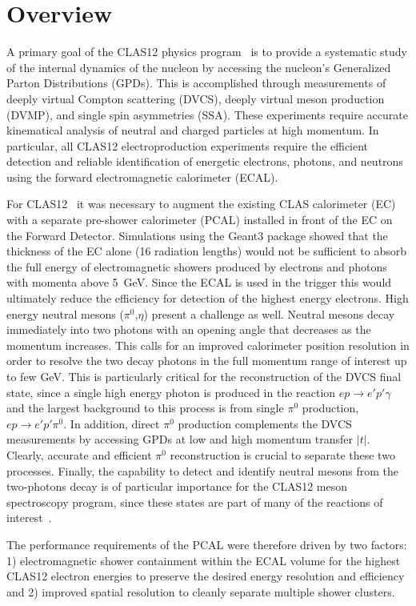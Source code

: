 \section{Overview}

A primary goal of the CLAS12 physics program~\cite{Burkert:2018nvj} is to provide a systematic study of
the internal dynamics of the nucleon by accessing the nucleon's Generalized Parton Distributions (GPDs). This
is accomplished through measurements of deeply virtual Compton scattering (DVCS), deeply virtual meson
production (DVMP), and single spin asymmetries (SSA). These experiments require accurate kinematical
analysis of neutral and charged particles at high momentum. In particular, all CLAS12 electroproduction
experiments require the efficient detection and reliable identification of energetic electrons, photons, and
neutrons using the forward electromagnetic calorimeter (ECAL).

For CLAS12~\cite{nim:overview} it was necessary to augment the existing CLAS calorimeter (EC)~\cite{clas6nim}
with a separate pre-shower calorimeter (PCAL) installed in front of the EC on the Forward Detector. Simulations
using the Geant3 package showed that the thickness of the EC alone (16 radiation lengths) would not be sufficient
to absorb the full energy of electromagnetic showers produced by electrons and photons with momenta above
5~GeV. Since the ECAL is used in the trigger this would ultimately reduce the efficiency for detection of the
highest energy electrons. High energy neutral mesons ($\pi^0$,$\eta$) present a challenge as well. Neutral
mesons decay immediately into two photons with an opening angle that decreases as the momentum increases. This
calls for an improved calorimeter position resolution in order to resolve the two decay photons in the full momentum
range of interest up to few GeV.  This is particularly critical for the reconstruction of the DVCS final state, since
a single high energy photon is produced in the reaction $ep \to e'p'\gamma$ and the largest background to this
process is from single $\pi^0$ production, $ep \to e'p'\pi^0$. In addition, direct $\pi^0$ production complements
the DVCS measurements by accessing GPDs at low and high momentum transfer $|t|$. Clearly, accurate and efficient
$\pi^0$ reconstruction is crucial to separate these two processes. Finally, the capability to detect and identify
neutral mesons from the two-photons decay is of particular importance for the CLAS12 meson spectroscopy program,
since these states are part of many of the reactions of interest~\cite{MesonSpec}.

The performance requirements of the PCAL were therefore driven by two factors: 1) electromagnetic shower
containment within the ECAL volume for the highest CLAS12 electron energies to preserve the desired energy
resolution and efficiency and 2) improved spatial resolution to cleanly separate multiple shower clusters.
